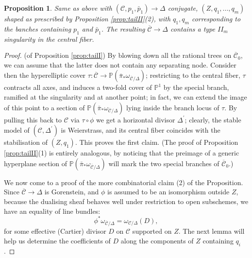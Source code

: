 \documentclass[11pt]{amsart}
\newcommand{\PP}{\mathbb P}
\renewcommand{\to}{\rightarrow}
\newcommand{\dvr}{\Delta}
\theoremstyle{plain}
\newtheorem{prop}[thm]{Proposition}
\theoremstyle{definition}
\begin{document}
\begin{prop}\label{prop:contractionII}
 Same as above with $(\mathcal C,p_1,\bar p_1)\to \Delta$ conjugate, $(Z,q_1,\ldots,q_m)$ shaped as prescribed by Proposition \ref{prop:tailII}(2), with $q_1,q_m$ corresponding to the banches containing $p_1$ and $\bar p_1$. The resulting $\overline{\mathcal C}\to\dvr$ contains a type $I\!I_m$ singularity in the central fiber.
\end{prop}

\begin{proof}(of Proposition \ref{prop:tailI}) By blowing down all the rational trees on $\overline{\mathcal C}_0$, we can assume that the latter does not contain any separating node. Consider then the hyperelliptic cover $\tau\colon\overline{\mathcal C}\to\PP(\bar\pi_*\omega_{\overline{\mathcal C}/\dvr})$; restricting to the central fiber, $\tau$ contracts all axes, and induces a two-fold cover of $\PP^1$ by the special branch, ramified at the singularity and at another point; in fact, we can extend the image of this point to a section of $\PP(\bar\pi_*\omega_{\overline{\mathcal C}/\dvr})$ lying inside the branch locus of $\tau$. By pulling this back to $\mathcal C$ via $\tau\circ\phi$ we get a horizontal divisor $\Delta^\prime$; clearly, the stable model of $(\mathcal C,\Delta^\prime)$ is Weierstrass, and its central fiber coincides with the stabilisation of $(Z,q_1)$. This proves the first claim. (The proof of Proposition \ref{prop:tailII}(1) is entirely analogous, by noticing that the preimage of a generic hyperplane section of $\PP(\bar\pi_*\omega_{\overline{\mathcal C}/\dvr})$ will mark the two special branches of $\overline{\mathcal C}_0$.)

We now come to a proof of the more combinatorial claim (2) of the Proposition. Since $\overline{\mathcal C}\to \Delta$ is Gorenstein, and $\phi$ is assumed to be an isomorphism outside $Z$, because the dualising sheaf behaves well under restriction to open subschemes, we have an equality of line bundles:
\[ \phi^*\omega_{\overline{\mathcal C}/\dvr}=\omega_{\mathcal C/\dvr}(D),\]
for some effective (Cartier) divisor $D$ on $\mathcal C$ supported on $Z$. The next lemma will help us determine the coefficients of $D$ along the components of $Z$ containing $q_i$.


\end{proof}
\end{document}
